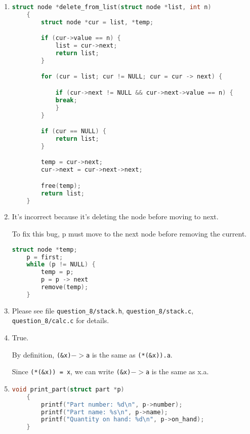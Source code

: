 \documentclass[12pt]{article}
\begin{document}
\begin{enumerate}[1.]
    \item

\begin{lstlisting}[language=c]
    struct node *delete_from_list(struct node *list, int n)
    {
        struct node *cur = list, *temp;

        if (cur->value == n) {
            list = cur->next;
            return list;
        }

        for (cur = list; cur != NULL; cur = cur -> next) {

            if (cur->next != NULL && cur->next->value == n) {
            break;
            }
        }

        if (cur == NULL) {
            return list;
        }

        temp = cur->next;
        cur->next = cur->next->next;

        free(temp);
        return list;
    }
\end{lstlisting}

    \item

    It's incorrect because it's deleting the node before moving to next.

    \bigskip

    To fix this bug, p must move to the next node before removing the current.

\begin{lstlisting}[language=c]
    struct node *temp;
    p = first;
    while (p != NULL) {
        temp = p;
        p = p -> next
        remove(temp);
    }
\end{lstlisting}

    \item

    Please see file \texttt{question\_8/stack.h}, \texttt{question\_8/stack.c},
    \texttt{question\_8/calc.c} for details.

    \item

    True.

    \bigskip

    By definition, \texttt{(\&x)$->$a} is the same as \texttt{(*(\&x)).a}.

    \bigskip

    Since \texttt{(*(\&x)) = x}, we can write \texttt{(\&x)$->$a} is the same
    as x.a.

    \item

\begin{lstlisting}[language=c]
    void print_part(struct part *p)
    {
        printf("Part number: %d\n", p->number);
        printf("Part name: %s\n", p->name);
        printf("Quantity on hand: %d\n", p->on_hand);
    }
\end{lstlisting}


\end{enumerate}
\end{document}
